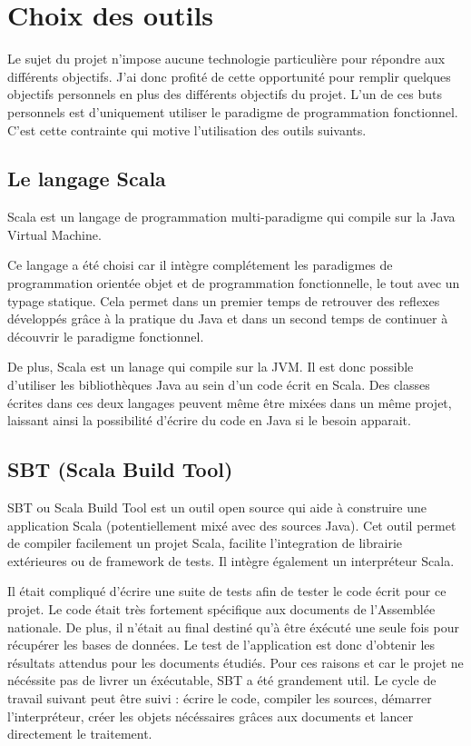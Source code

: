 \section{Choix des outils}

Le sujet du projet n'impose aucune technologie particulière pour répondre aux différents objectifs. J'ai donc profité de cette opportunité pour remplir quelques objectifs personnels en plus des différents objectifs du projet. L'un de ces buts personnels est d'uniquement utiliser le paradigme de programmation fonctionnel. C'est cette contrainte qui motive l'utilisation des outils suivants.

\subsection{Le langage Scala}

Scala est un langage de programmation multi-paradigme qui compile sur la Java Virtual Machine.

Ce langage a été choisi car il intègre complétement les paradigmes de programmation orientée objet et de programmation fonctionnelle, le tout avec un typage statique. Cela permet dans un premier temps de retrouver des reflexes développés grâce à la pratique du Java et dans un second temps de continuer à découvrir le paradigme fonctionnel.

De plus, Scala est un lanage qui compile sur la JVM. Il est donc possible d'utiliser les bibliothèques Java au sein d'un code écrit en Scala. Des classes écrites dans ces deux langages peuvent même être mixées dans un même projet, laissant ainsi la possibilité d'écrire du code en Java si le besoin apparait.

\subsection{SBT (Scala Build Tool)}

SBT ou Scala Build Tool est un outil open source qui aide à construire une application Scala (potentiellement mixé avec des sources Java). Cet outil permet de compiler facilement un projet Scala, facilite l'integration de librairie extérieures ou de framework de tests. Il intègre également un interpréteur Scala.

Il était compliqué d'écrire une suite de tests afin de tester le code écrit pour ce projet. Le code était très fortement spécifique aux documents de l'Assemblée nationale. De plus, il n'était au final destiné qu'à être éxécuté une seule fois pour récupérer les bases de données. Le test de l'application est donc d'obtenir les résultats attendus pour les documents étudiés.\newline
Pour ces raisons et car le projet ne nécéssite pas de livrer un éxécutable, SBT a été grandement util. Le cycle de travail suivant peut être suivi : écrire le code, compiler les sources, démarrer l'interpréteur, créer les objets nécéssaires grâces aux documents et lancer directement le traitement.
